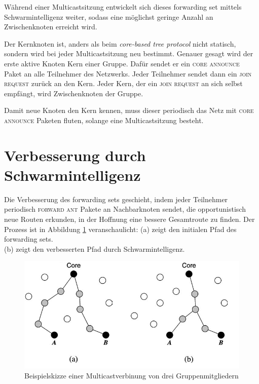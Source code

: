 Während einer Multicastsitzung entwickelt sich dieses forwarding set mittels Schwarmintelligenz weiter, sodass 
eine möglichst geringe Anzahl an Zwischenknoten erreicht wird.

Der Kernknoten ist, anders als beim \emph{core-based tree protocol}
nicht statisch, sondern wird bei jeder Multicastsitzung neu bestimmt.
Genauer gesagt wird der erste aktive Knoten Kern einer Gruppe.
Dafür sendet er ein \textsc{core announce} Paket an alle Teilnehmer des Netzwerks.
Jeder Teilnehmer sendet dann ein \textsc{join request} zurück an den Kern.
Jeder Kern, der ein \textsc{join request} an sich selbst empfängt, wird Zwischenknoten der Gruppe.

Damit neue Knoten den Kern kennen, muss dieser periodisch das Netz mit \textsc{core announce} Paketen fluten,
solange eine Multicastsitzung besteht.

\section{Verbesserung durch Schwarmintelligenz}
Die Verbesserung des forwarding sets geschieht, indem jeder Teilnehmer periodisch \textsc{forward ant} Pakete an Nachbarknoten sendet,
die opportunistisch neue Routen erkunden, in der Hoffnung eine bessere Gesamtroute zu finden.
Der Prozess ist in Abbildung \ref{fig:MANSI1} veranschaulicht:
(a) zeigt den initialen Pfad des forwarding sets.\\
(b) zeigt den verbesserten Pfad durch Schwarmintelligenz.


\begin{center}
\begin{figure}[htbp]
 \includegraphics[width=12cm,keepaspectratio=true]{./images/adhoc.png}
 \caption{Beispielskizze einer Multicastverbinung von drei Gruppenmitgliedern}
\label{fig:MANSI1}
\end{figure}
\end{center}

